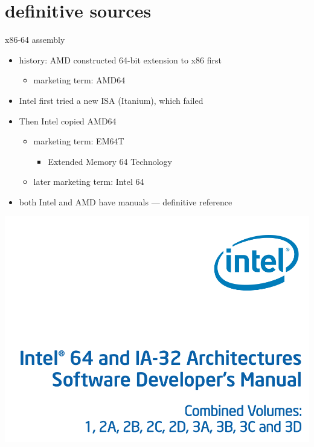 

\lstset{language=myasm}

\section{definitive sources}
\begin{frame}{x86-64 assembly}
\begin{itemize}
\item history: AMD constructed 64-bit extension to x86 first
    \begin{itemize}
    \item marketing term: AMD64
    \end{itemize}
\item Intel first tried a new ISA (Itanium), which failed
\item Then Intel copied AMD64
    \begin{itemize}
    \item marketing term: EM64T
        \begin{itemize}\item Extended Memory 64 Technology\end{itemize}
    \item later marketing term: Intel 64
    \end{itemize}
\item both Intel and AMD have manuals --- definitive reference
\end{itemize}
\end{frame}

\begin{frame}
\includegraphics[height=0.9\textheight]{../asm/manual-screenshot}
\end{frame}

